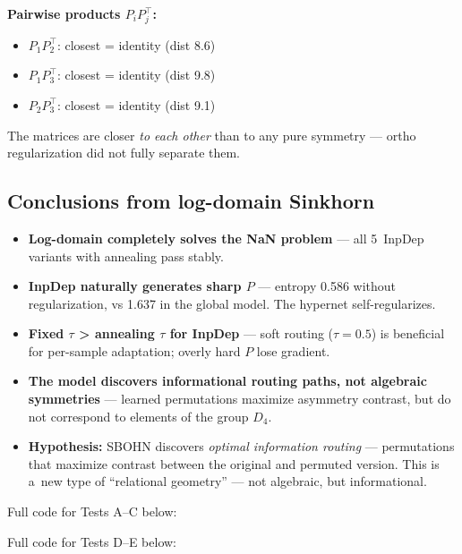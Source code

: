 \documentclass[11pt,a4paper]{report}
\begin{document}
\textbf{Pairwise products $P_iP_j^\top$:}
\begin{itemize}
    \item $P_1 P_2^\top$: closest = identity (dist 8.6)
    \item $P_1 P_3^\top$: closest = identity (dist 9.8)
    \item $P_2 P_3^\top$: closest = identity (dist 9.1)
\end{itemize}

The matrices are closer \emph{to each other} than to any pure symmetry --- ortho regularization did not fully separate them.


\subsection{Conclusions from log-domain Sinkhorn}

\begin{itemize}
    \item \textbf{Log-domain completely solves the NaN problem} --- all 5~InpDep variants with annealing pass stably.
    \item \textbf{InpDep naturally generates sharp $P$} --- entropy 0.586 without regularization, vs 1.637 in the global model. The hypernet self-regularizes.
    \item \textbf{Fixed $\tau$ > annealing $\tau$ for InpDep} --- soft routing ($\tau=0.5$) is beneficial for per-sample adaptation; overly hard $P$ lose gradient.
    \item \textbf{The model discovers informational routing paths, not algebraic symmetries} --- learned permutations maximize asymmetry contrast, but do not correspond to elements of the group $D_4$.
    \item \textbf{Hypothesis:} SBOHN discovers \emph{optimal information routing} --- permutations that maximize contrast between the original and permuted version. This is a~new type of ``relational geometry'' --- not algebraic, but informational.
\end{itemize}

Full code for Tests A--C below:

\noindent{}


Full code for Tests D--E below:

\noindent{}
\end{document}
